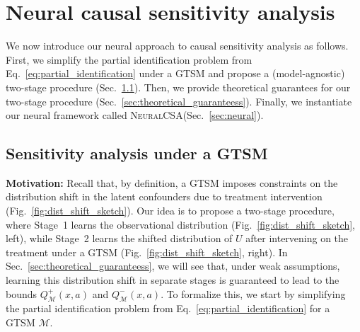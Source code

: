 \documentclass{article} %
\newcommand{\frameworkname}{\textsc{NeuralCSA}\xspace}
\theoremstyle{definition}
\theoremstyle{plain}
\begin{document}
\section{Neural causal sensitivity analysis}

We now introduce our neural approach to causal sensitivity analysis as follows. First, we simplify the partial identification problem from Eq.~\eqref{eq:partial_identification} under a GTSM and propose a (model-agnostic) two-stage procedure (Sec.~\ref{sec:two_stage}). Then, we provide theoretical guarantees for our two-stage procedure (Sec.~\ref{sec:theoretical_guaranteess}). Finally, we instantiate our neural framework called \frameworkname (Sec.~\ref{sec:neural}).


\subsection{Sensitivity analysis under a GTSM}\label{sec:two_stage}

\textbf{Motivation:} Recall that, by definition, a GTSM imposes constraints on the distribution shift in the latent confounders due to treatment intervention (Fig.~\ref{fig:dist_shift_sketch}). Our idea is to propose a two-stage procedure, where Stage~1 learns the observational distribution (Fig.~\ref{fig:dist_shift_sketch}, left), while Stage~2 learns the shifted distribution of $U$ after intervening on the treatment under a GTSM (Fig.~\ref{fig:dist_shift_sketch}, right). In Sec.~\ref{sec:theoretical_guaranteess}, we will see that, under weak assumptions, learning this distribution shift in separate stages is guaranteed to lead to the bounds $Q^+_\mathcal{M}(x, a)$ and $Q^-_\mathcal{M}(x, a)$. To formalize this, we start by simplifying the partial identification problem from Eq.~\eqref{eq:partial_identification} for a GTSM $\mathcal{M}$.
\end{document}
